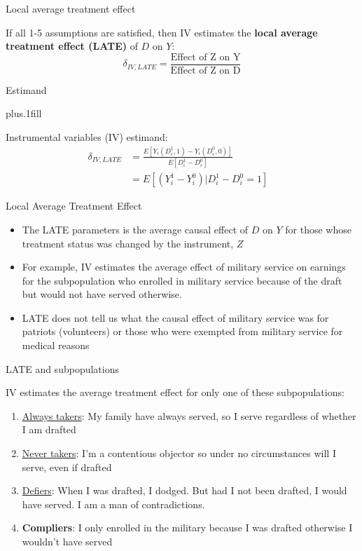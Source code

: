 \documentclass{beamer}
\begin{document}
\begin{frame}{Local average treatment effect}

  If all 1-5 assumptions are satisfied, then IV estimates the \textbf{local average treatment effect (LATE)} of $D$ on $Y$: $$\delta_{IV,LATE} =\frac{\text{Effect of Z on Y}}{\text{Effect of Z on D}}$$

\end{frame}

\begin{frame}{Estimand}

  \vskip3pt plus.1fill

  Instrumental variables (IV) estimand:
  \begin{align*}
    \delta_{IV,LATE} & = \frac{E[Y_i(D^1_i, 1) - Y_i(D^0_i, 0)]}{E[D^1_i - D^0_i]} &   \\
    & = E[(Y^1_i - Y^0_i) | D^1_i - D^0_i = 1]
  \end{align*}

\end{frame}

\begin{frame}{Local Average Treatment Effect}

  \begin{itemize}
    \item The LATE parameters is the average causal effect of $D$ on $Y$ for those whose treatment status was changed by the instrument, $Z$
    \item For example, IV estimates the average effect of military service on earnings for the subpopulation who enrolled in military service because of the draft but would not have served otherwise.
    \item LATE does not tell us what the causal effect of military service was for patriots (volunteers) or those who were exempted from military service for medical reasons
  \end{itemize}

\end{frame}


\begin{frame}{LATE and subpopulations}

  IV estimates the average treatment effect for only one of these subpopulations:
  \begin{enumerate}
    \item \underline{Always takers}: My family have always served, so I serve regardless of whether I am drafted
    \item \underline{Never takers}: I'm a contentious objector so under no circumstances will I serve, even if drafted
    \item \underline{Defiers}: When I was drafted, I dodged. But had I not been drafted, I would have served. I am a man of contradictions.
    \item \textbf{Compliers}: I only enrolled in the military because I was drafted otherwise I wouldn't have served
  \end{enumerate}
\end{frame}
\end{document}
